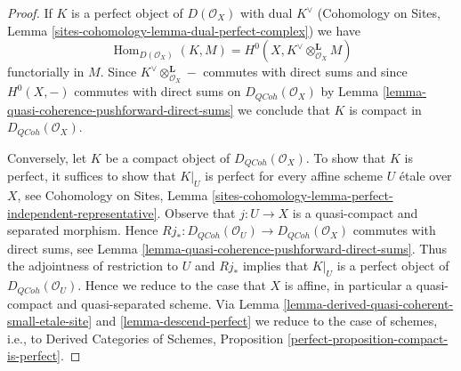 \documentclass[10pt,a4paper]{amsart}
\theoremstyle{plain}
\theoremstyle{definition}
\theoremstyle{remark}
\numberwithin{equation}{subsection}
\def\Hom{\mathop{\mathrm{Hom}}\nolimits}
\def\QCoh{\mathit{QCoh}}
\begin{document}
\begin{proof}
If $K$ is a perfect object of $D(\mathcal{O}_X)$ with dual
$K^\vee$ (Cohomology on Sites, Lemma
\ref{sites-cohomology-lemma-dual-perfect-complex})
we have
$$
\Hom_{D(\mathcal{O}_X)}(K, M) =
H^0(X, K^\vee \otimes_{\mathcal{O}_X}^\mathbf{L} M)
$$
functorially in $M$. Since $K^\vee \otimes_{\mathcal{O}_X}^\mathbf{L} -$
commutes with direct sums and since $H^0(X, -)$ commutes with direct
sums on $D_\QCoh(\mathcal{O}_X)$ by
Lemma \ref{lemma-quasi-coherence-pushforward-direct-sums}
we conclude that $K$ is compact in $D_\QCoh(\mathcal{O}_X)$.

\medskip\noindent
Conversely, let $K$ be a compact object of $D_\QCoh(\mathcal{O}_X)$.
To show that $K$ is perfect, it suffices to show that
$K|_U$ is perfect for every affine scheme $U$ \'etale over $X$, see
Cohomology on Sites, Lemma
\ref{sites-cohomology-lemma-perfect-independent-representative}.
Observe that $j : U \to X$ is a quasi-compact and separated morphism.
Hence
$Rj_* : D_\QCoh(\mathcal{O}_U) \to D_\QCoh(\mathcal{O}_X)$
commutes with direct sums, see
Lemma \ref{lemma-quasi-coherence-pushforward-direct-sums}.
Thus the adjointness of restriction to $U$ and $Rj_*$ implies that
$K|_U$ is a perfect object of $D_\QCoh(\mathcal{O}_U)$.
Hence we reduce to the case that $X$ is affine, in particular a
quasi-compact and quasi-separated scheme. Via
Lemma \ref{lemma-derived-quasi-coherent-small-etale-site} and
\ref{lemma-descend-perfect}
we reduce to the case of schemes, i.e., to
Derived Categories of Schemes, Proposition
\ref{perfect-proposition-compact-is-perfect}.
\end{proof}
\end{document}
